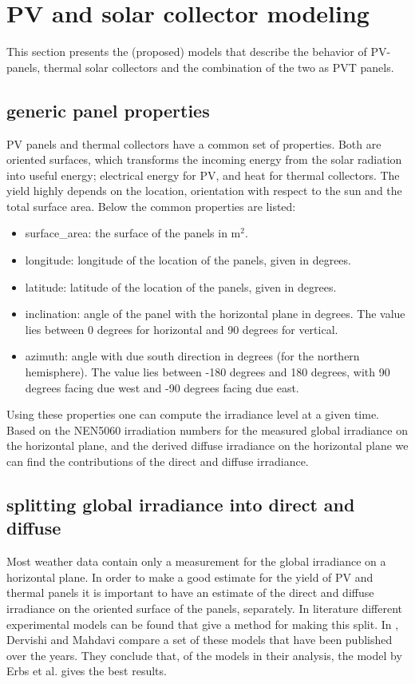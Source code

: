 \section{PV and solar collector modeling}\label{s:PV_solar_collector}

This section presents the (proposed) models that describe the behavior of PV-panels, thermal solar collectors and the combination of the two as PVT panels.


\subsection{generic panel properties}
PV panels and thermal collectors have a common set of properties. Both are oriented surfaces, which transforms the incoming energy from the solar radiation into useful energy; electrical energy for PV, and heat for thermal collectors. The yield highly depends on the location, orientation with respect to the sun and the total surface area. 
Below the common properties are listed:
\begin{itemize}
\item surface\_area: the surface of the panels in $\text{m}^2$. 
\item longitude: longitude of the location of the panels, given in degrees. 
\item latitude: latitude of the location of the panels, given in degrees.
\item inclination: angle of the panel with the horizontal plane in degrees. The value lies between 0 degrees for horizontal and 90 degrees for vertical.
\item azimuth: angle with due south direction in degrees (for the northern hemisphere). The value lies between -180 degrees and 180 degrees, with 90 degrees facing due west and -90 degrees facing due east.
\end{itemize}

Using these properties one can compute the irradiance level at a given time. Based on the NEN5060 irradiation numbers for the measured global irradiance on the horizontal plane, and the derived diffuse irradiance on the horizontal plane we can find the contributions of the direct and diffuse irradiance. 

\subsection{splitting global irradiance into direct and diffuse}
Most weather data contain only a measurement for the global irradiance on a horizontal plane. In order to make a good estimate for the yield of PV and thermal panels it is important to have an estimate of the direct and diffuse irradiance on the oriented surface of the panels, separately. In literature different experimental models can be found that give a method for making this split. In \cite{dervishi2012}, Dervishi and Mahdavi compare a set of these models that have been published over the years. They conclude that, of the models in their analysis, the model by Erbs et al. \cite{erbs1982estimation} gives the best results.

